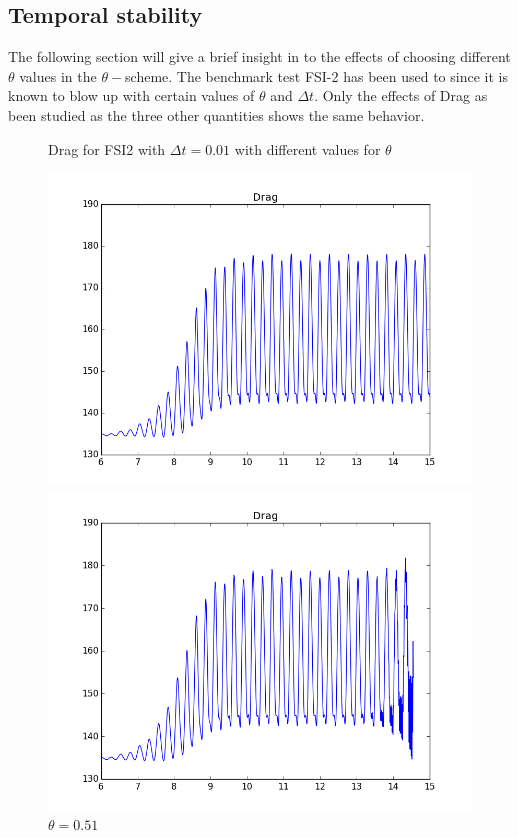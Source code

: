 \subsection{Temporal stability}
The following section will give a brief insight in to the effects of choosing different $\theta$ values in the $\theta-$scheme. The benchmark test FSI-2 has been used to since it is known to blow up with certain values of $\theta$ and $\Delta t$. Only the effects of Drag as been studied as the three other quantities shows the same behavior.   


\begin{figure}[H]  \label{fig:FSI2drag_plots} 
  \caption {Drag for FSI2 with $\Delta t = 0.01$ with different values for $\theta$}
  \begin{minipage}[b]{0.5\linewidth}
    \centering
    \includegraphics[scale=0.35]{./Verification_Validation/Temporal_stability/FSI2_001_051_big.png} 
    \caption{$\theta = 0.51 $} 
    \vspace{4ex}
  \end{minipage}%
  \begin{minipage}[b]{0.5\linewidth}
    \centering
    \includegraphics[scale=0.35]{./Verification_Validation/Temporal_stability/FSI2_001_050_big.png} 

\end{minipage}
\end{figure}
